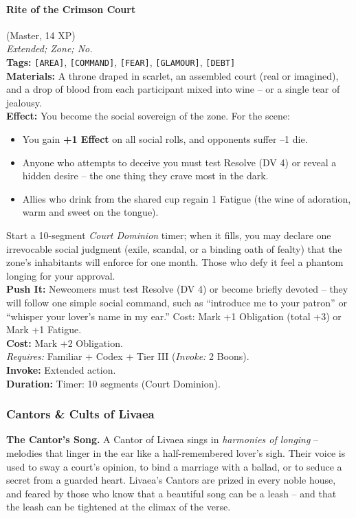 \paragraph{Rite of the Crimson Court} (Master, 14 XP) \hfill \\
\emph{Extended; Zone; No.} \\
\textbf{Tags:} \texttt{[AREA]}, \texttt{[COMMAND]}, \texttt{[FEAR]}, \texttt{[GLAMOUR]}, \texttt{[DEBT]} \\
\textbf{Materials:} A throne draped in scarlet, an assembled court (real or imagined), and a drop of blood from each participant mixed into wine -- or a single tear of jealousy. \\
\textbf{Effect:} You become the social sovereign of the zone. For the scene:
\begin{itemize}
  \item You gain \textbf{+1 Effect} on all social rolls, and opponents suffer --1 die.
  \item Anyone who attempts to deceive you must test Resolve (DV 4) or reveal a hidden desire -- the one thing they crave most in the dark.
  \item Allies who drink from the shared cup regain 1 Fatigue (the wine of adoration, warm and sweet on the tongue).
\end{itemize}
Start a 10-segment \textit{Court Dominion} timer; when it fills, you may declare one irrevocable social judgment (exile, scandal, or a binding oath of fealty) that the zone's inhabitants will enforce for one month. Those who defy it feel a phantom longing for your approval. \\
\textbf{Push It:} Newcomers must test Resolve (DV 4) or become briefly devoted -- they will follow one simple social command, such as ``introduce me to your patron'' or ``whisper your lover's name in my ear.'' Cost: Mark +1 Obligation (total +3) or Mark +1 Fatigue. \\
\textbf{Cost:} Mark +2 Obligation. \\
\textit{Requires:} Familiar + Codex + Tier III (\textit{Invoke:} 2 Boons). \\
\textbf{Invoke:} Extended action. \\
\textbf{Duration:} Timer: 10 segments (Court Dominion).

\subsubsection*{Cantors \& Cults of Livaea}

\textbf{The Cantor's Song.} A Cantor of Livaea sings in \textit{harmonies of longing} -- melodies that linger in the ear like a half-remembered lover's sigh. Their voice is used to sway a court's opinion, to bind a marriage with a ballad, or to seduce a secret from a guarded heart. Livaea's Cantors are prized in every noble house, and feared by those who know that a beautiful song can be a leash -- and that the leash can be tightened at the climax of the verse.

